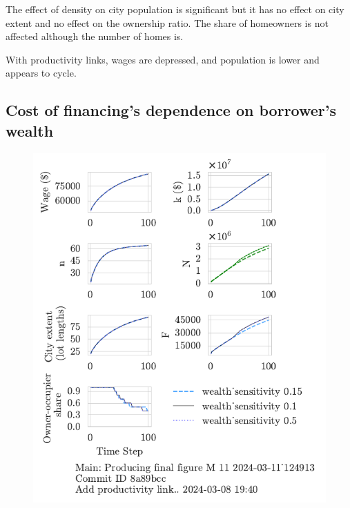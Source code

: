 The effect of density on city population is significant but it has no effect on city extent and no effect on the ownership ratio. The share of homeowners is not affected although the number of homes is. 

With productivity links, wages are depressed, and population is lower and appears to cycle.

\newpage %
\subsection{Cost of financing's dependence on borrower's wealth}
\begin{figure}[h!tb] 
    \centering
    \includegraphics[scale=.75, trim={0 1.4cm 1.0cm 0},clip]{fig/wealth_sensitivity-124913.pdf} 

\end{figure}
